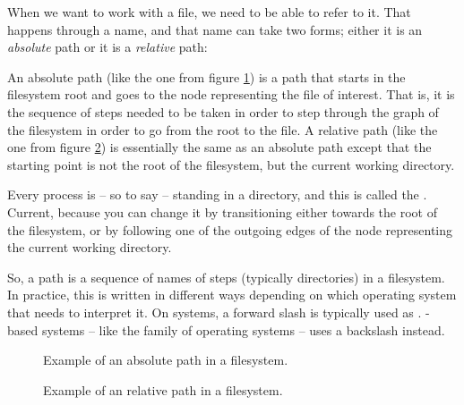 When we want to work with a file, we need to be able to refer to it. That happens through a name, and that name can take two forms; either it is an \textsl{absolute} path or it is a \textsl{relative} path:
\begin{itemize}
   An absolute path (like the one from figure \ref{fig:bs:fs:path:abs}) is a path that starts in the filesystem root and goes to the node representing the file of interest. That is, it is the sequence of steps needed to be taken in order to step through the graph of the filesystem in order to go from the root to the file.
   A relative path (like the one from figure \ref{fig:bs:fs:path:rel}) is essentially the same as an absolute path except that the starting point is not the root of the filesystem, but the current working directory.

  Every process is -- so to say -- standing in a directory, and this is called the . Current, because you can change it by transitioning either towards the root of the filesystem, or by following one of the outgoing edges of the node representing the current working directory.
\end{itemize}

So, a path is a sequence of names of steps (typically directories) in a filesystem. In practice, this is written in different ways depending on which operating system that needs to interpret it. On  systems, a forward slash \say{/} is typically used as . -based systems -- like the  family of operating systems -- uses a backslash \say{\textbackslash} instead.

\begin{figure}[tbp]
  
  \caption{Example of an absolute path in a filesystem.}
  \label{fig:bs:fs:path:abs}
\end{figure}

\begin{figure}[tbp]
  
  \caption{Example of an relative path in a filesystem.}
  \label{fig:bs:fs:path:rel}
\end{figure}
